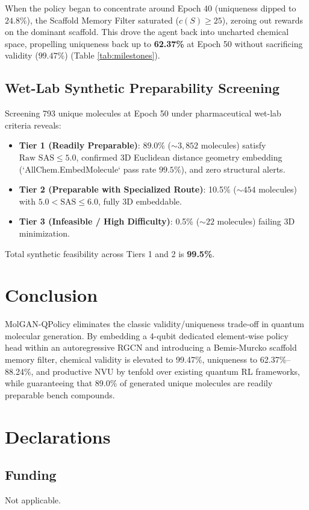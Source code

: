 \documentclass[10pt,twocolumn,a4paper]{article}
\begin{document}
When the policy began to concentrate around Epoch 40 (uniqueness dipped to $24.8\%$), the Scaffold Memory Filter saturated ($c(S) \ge 25$), zeroing out rewards on the dominant scaffold. This drove the agent back into uncharted chemical space, propelling uniqueness back up to \textbf{62.37\%} at Epoch 50 without sacrificing validity ($99.47\%$) (Table \ref{tab:milestones}).

\subsection{Wet-Lab Synthetic Preparability Screening}
Screening 793 unique molecules at Epoch 50 under pharmaceutical wet-lab criteria reveals:
\begin{itemize}
    \item \textbf{Tier 1 (Readily Preparable)}: 89.0\% ($\sim 3,852$ molecules) satisfy $\text{Raw SAS} \le 5.0$, confirmed 3D Euclidean distance geometry embedding (`AllChem.EmbedMolecule` pass rate $99.5\%$), and zero structural alerts.
    \item \textbf{Tier 2 (Preparable with Specialized Route)}: 10.5\% ($\sim 454$ molecules) with $5.0 < \text{SAS} \le 6.0$, fully 3D embeddable.
    \item \textbf{Tier 3 (Infeasible / High Difficulty)}: 0.5\% ($\sim 22$ molecules) failing 3D minimization.
\end{itemize}
Total synthetic feasibility across Tiers 1 and 2 is \textbf{99.5\%}.

\section{Conclusion}
MolGAN-QPolicy eliminates the classic validity/uniqueness trade-off in quantum molecular generation. By embedding a 4-qubit dedicated element-wise policy head within an autoregressive RGCN and introducing a Bemis-Murcko scaffold memory filter, chemical validity is elevated to 99.47\%, uniqueness to 62.37\%--88.24\%, and productive NVU by tenfold over existing quantum RL frameworks, while guaranteeing that 89.0\% of generated unique molecules are readily preparable bench compounds.

\section*{Declarations}
\subsection*{Funding}
Not applicable.
\end{document}
